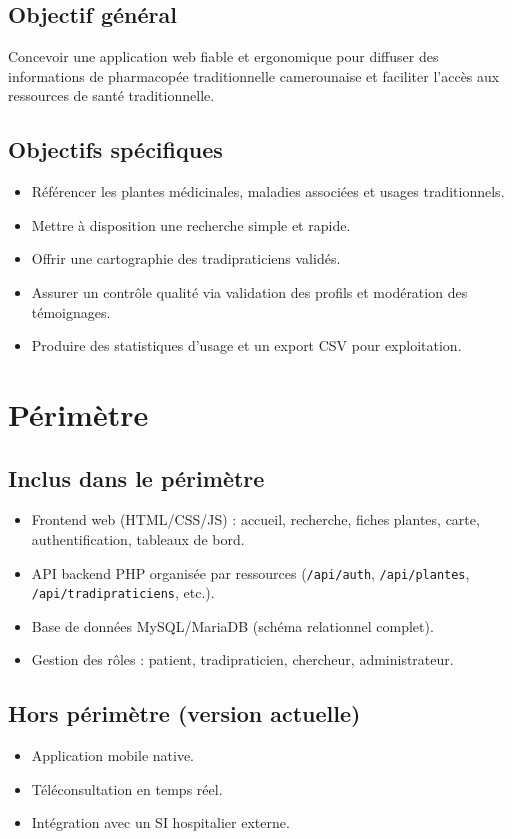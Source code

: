 \documentclass[12pt,a4paper]{article}
\begin{document}
\subsection{Objectif général}
Concevoir une application web fiable et ergonomique pour diffuser des informations de pharmacopée traditionnelle camerounaise et faciliter l'accès aux ressources de santé traditionnelle.

\subsection{Objectifs spécifiques}
\begin{itemize}[leftmargin=1.2cm]
  \item Référencer les plantes médicinales, maladies associées et usages traditionnels.
  \item Mettre à disposition une recherche simple et rapide.
  \item Offrir une cartographie des tradipraticiens validés.
  \item Assurer un contrôle qualité via validation des profils et modération des témoignages.
  \item Produire des statistiques d'usage et un export CSV pour exploitation.
\end{itemize}

\section{Périmètre}
\subsection{Inclus dans le périmètre}
\begin{itemize}[leftmargin=1.2cm]
  \item Frontend web (HTML/CSS/JS) : accueil, recherche, fiches plantes, carte, authentification, tableaux de bord.
  \item API backend PHP organisée par ressources (\texttt{/api/auth}, \texttt{/api/plantes}, \texttt{/api/tradipraticiens}, etc.).
  \item Base de données MySQL/MariaDB (schéma relationnel complet).
  \item Gestion des rôles : patient, tradipraticien, chercheur, administrateur.
\end{itemize}

\subsection{Hors périmètre (version actuelle)}
\begin{itemize}[leftmargin=1.2cm]
  \item Application mobile native.
  \item Téléconsultation en temps réel.
  \item Intégration avec un SI hospitalier externe.
\end{itemize}
\end{document}
